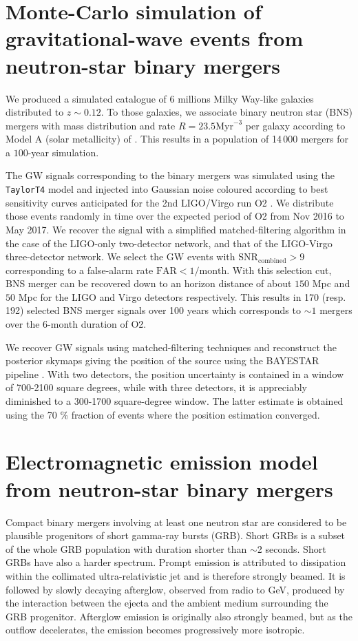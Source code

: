 \documentclass[11pt]{article}
\begin{document}
\section*{Monte-Carlo simulation of gravitational-wave events from neutron-star binary mergers}

We produced a simulated catalogue of 6 millions Milky Way-like galaxies
distributed to $z\sim 0.12$. To those galaxies, we associate binary neutron star
(BNS) mergers with mass distribution and rate $R=23.5 \mathrm{Myr}^{-3}$ per galaxy
according to Model A (solar metallicity) of
\citep{2012ApJ...759...52D}. This results in a population of 14\,000
mergers for a $100$-year simulation.

The GW signals corresponding to the binary mergers was simulated using the
\texttt{TaylorT4} model and injected into Gaussian noise coloured according to
best sensitivity curves anticipated for the 2nd LIGO/Virgo run O2
\citep{2016LRR....19....1A}. We distribute those events randomly in time over
the expected period of O2 from Nov 2016 to May 2017. We recover the signal with
a simplified matched-filtering algorithm\citep{2016PhRvD..93b4013S} in the case
of the LIGO-only two-detector network, and that of the LIGO-Virgo three-detector
network. We select the GW events with $\mathrm{SNR}_{\mathrm{combined}} > 9$
corresponding to a false-alarm rate $\mathrm{FAR} < 1/\mathrm{month}$.  With
this selection cut, BNS merger can be recovered down to an horizon distance of
about $150$ Mpc and $50$ Mpc for the LIGO and Virgo detectors respectively.
This results in 170 (resp. 192) selected BNS merger signals over 100
years which corresponds to $\sim 1$ mergers over the 6-month duration of O2.

We recover GW signals using matched-filtering techniques and reconstruct the
posterior skymaps giving the position of the source using the BAYESTAR pipeline
\citep{2016PhRvD..93b4013S}.  With two detectors, the position uncertainty is
contained in a window of 700-2100 square degrees, while with three detectors, it
is appreciably diminished to a 300-1700 square-degree window. The latter
estimate is obtained using the 70 \% fraction of events where the position
estimation converged.

\section*{Electromagnetic emission model from neutron-star binary mergers}

Compact binary mergers involving at least one neutron star are considered to be
plausible progenitors of short gamma-ray bursts (GRB). Short GRBs is a
subset of the whole GRB population with duration shorter than $\sim$2
seconds. Short GRBs have also a harder spectrum. Prompt emission is attributed
to dissipation within the collimated ultra-relativistic jet and is therefore
strongly beamed. It is followed by slowly decaying afterglow, observed from
radio to GeV, produced by the interaction between the ejecta and the ambient
medium surrounding the GRB progenitor. Afterglow emission is originally also
strongly beamed, but as the outflow decelerates, the emission becomes
progressively more isotropic.
\end{document}
